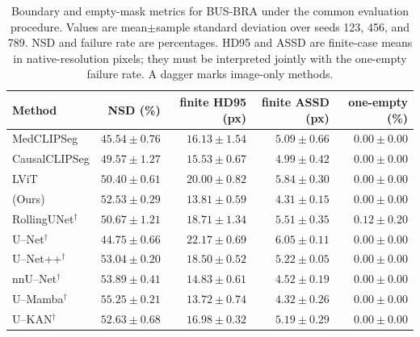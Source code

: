 \begin{table}[htbp]
\centering
\caption{Boundary and empty-mask metrics for BUS-BRA under the common evaluation procedure. Values are mean$\pm$sample standard deviation over seeds 123, 456, and 789. NSD and failure rate are percentages. HD95 and ASSD are finite-case means in native-resolution pixels; they must be interpreted jointly with the one-empty failure rate. A dagger marks image-only methods.}
\label{tab:supp_boundary_medclipseg_busbra}
\footnotesize
\setlength{\tabcolsep}{4.0pt}
\begin{tabular}{@{}lrrrr@{}}
\toprule
Method & NSD (\%) & finite HD95 (px) & finite ASSD (px) & one-empty (\%) \\
\midrule
MedCLIPSeg & $45.54\pm0.76$ & $16.13\pm1.54$ & $5.09\pm0.66$ & $0.00\pm0.00$ \\
CausalCLIPSeg & $49.57\pm1.27$ & $15.53\pm0.67$ & $4.99\pm0.42$ & $0.00\pm0.00$ \\
LViT & $50.40\pm0.61$ & $20.00\pm0.82$ & $5.84\pm0.30$ & $0.00\pm0.00$ \\
\methodname{} (Ours) & $52.53\pm0.29$ & $13.81\pm0.59$ & $4.31\pm0.15$ & $0.00\pm0.00$ \\
RollingUNet$^\dagger$ & $50.67\pm1.21$ & $18.71\pm1.34$ & $5.51\pm0.35$ & $0.12\pm0.20$ \\
U--Net$^\dagger$ & $44.75\pm0.66$ & $22.17\pm0.69$ & $6.05\pm0.11$ & $0.00\pm0.00$ \\
U--Net++$^\dagger$ & $53.04\pm0.20$ & $18.50\pm0.52$ & $5.22\pm0.05$ & $0.00\pm0.00$ \\
nnU--Net$^\dagger$ & $53.89\pm0.41$ & $14.83\pm0.61$ & $4.52\pm0.19$ & $0.00\pm0.00$ \\
U--Mamba$^\dagger$ & $55.25\pm0.21$ & $13.72\pm0.74$ & $4.32\pm0.26$ & $0.00\pm0.00$ \\
U--KAN$^\dagger$ & $52.63\pm0.68$ & $16.98\pm0.32$ & $5.19\pm0.29$ & $0.00\pm0.00$ \\
\bottomrule
\end{tabular}
\end{table}

